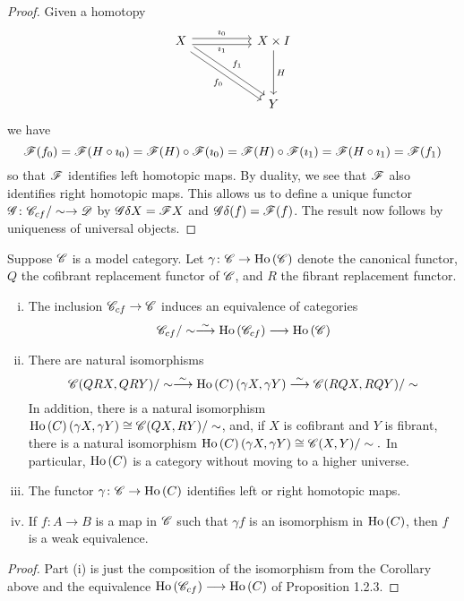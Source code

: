 \documentclass[10pt]{amsart}
\begin{document}
\begin{cor}
\begin{proof}
    Given a homotopy 
    $$\begin{tikzcd}
      X \arrow[shift left]{rrdd}{f_1} \arrow[shift right,swap]{rrdd}{f_0} \arrow[shift left]{rr}{\imath_0} \arrow[shift right,swap]{rr}{\imath_1} && X \times I \arrow{dd}{H}\\
      \\
      && Y
    \end{tikzcd}$$
    we have
    $$\mathscr{F}(f_0) = 
    \mathscr{F}(H \circ \imath_0) =
    \mathscr{F}(H) \circ \mathscr{F}(\imath_0) = 
    \mathscr{F}(H) \circ \mathscr{F}(\imath_1) = 
    \mathscr{F}(H \circ \imath_1) = 
    \mathscr{F}(f_1)$$
    so that $\mathscr{F}$ identifies left homotopic maps.
    By duality, we see that $\mathscr{F}$ also identifies right homotopic maps.
    This allows us to define a unique functor $\mathscr{G} \colon \mathscr{C}_{cf}/\sim \to \mathscr{D}$ by $\mathscr{G} \delta X = \mathscr{F} X$ and $\mathscr{G} \delta(f) = \mathscr{F}(f)$.
    The result now follows by uniqueness of universal objects.
  \end{proof}
\end{cor}

\begin{thm}
  Suppose $\mathscr{C}$ is a model category.
  Let $\gamma \colon \mathscr{C} \to \operatorname{Ho}\left(\mathscr{C}\right)$ denote the canonical functor, $Q$ the cofibrant replacement functor of $\mathscr{C}$, and $R$ the fibrant replacement functor.
  \begin{enumerate}[(i)]
  \item
    The inclusion $\mathscr{C}_{cf} \to \mathscr{C}$ induces an equivalence of categories
    $$\mathscr{C}_{cf}/\sim \overset{\sim}\longrightarrow \operatorname{Ho}\left(\mathscr{C}_{cf}\right) \longrightarrow \operatorname{Ho}\left(\mathscr{C}\right)$$
  \item
    There are natural isomorphisms
    $$\mathscr{C}(QRX, QRY)/\sim \overset{\sim}\longrightarrow \operatorname{Ho}\left(C\right)\left(\gamma X, \gamma Y\right) \overset{\sim}\longrightarrow \mathscr{C}(RQX, RQY)/\sim$$
    In addition, there is a natural isomorphism $\operatorname{Ho}\left(C\right)\left(\gamma X, \gamma Y\right) \cong \mathscr{C}(QX, RY)/\sim$, and, if $X$ is cofibrant and $Y$ is fibrant, there is a natural isomorphism $\operatorname{Ho}\left(C\right)\left(\gamma X, \gamma Y\right) \cong \mathscr{C}(X,Y)/\sim.$
    In particular, $\operatorname{Ho}\left(C\right)$ is a category without moving to a higher universe.
  \item
    The functor $\gamma \colon \mathscr{C} \to \operatorname{Ho}\left(C\right)$ identifies left or right homotopic maps.
  \item
    If $f \colon A \longrightarrow B$ is a map in $\mathscr{C}$ such that $\gamma f$ is an isomorphism in $\operatorname{Ho}\left(C\right)$, then $f$ is a weak equivalence.
  \end{enumerate}

  \begin{proof}
    Part (i) is just the composition of the isomorphism from the Corollary above and the equivalence $\operatorname{Ho}\left(\mathscr{C}_{cf}\right) \longrightarrow \operatorname{Ho}\left(C\right)$ of Proposition 1.2.3.
    
  \end{proof}
\end{thm}
\end{document}
